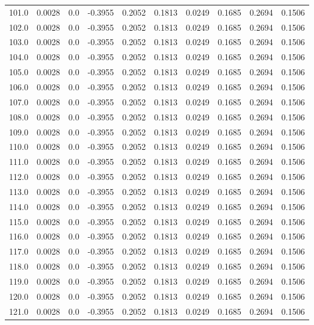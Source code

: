 \begin{longtable}{lrrrrrrrrr}
101.0 & 0.0028 & 0.0 & -0.3955 & 0.2052 & 0.1813 & 0.0249 & 0.1685 & 0.2694 & 0.1506 \\
102.0 & 0.0028 & 0.0 & -0.3955 & 0.2052 & 0.1813 & 0.0249 & 0.1685 & 0.2694 & 0.1506 \\
103.0 & 0.0028 & 0.0 & -0.3955 & 0.2052 & 0.1813 & 0.0249 & 0.1685 & 0.2694 & 0.1506 \\
104.0 & 0.0028 & 0.0 & -0.3955 & 0.2052 & 0.1813 & 0.0249 & 0.1685 & 0.2694 & 0.1506 \\
105.0 & 0.0028 & 0.0 & -0.3955 & 0.2052 & 0.1813 & 0.0249 & 0.1685 & 0.2694 & 0.1506 \\
106.0 & 0.0028 & 0.0 & -0.3955 & 0.2052 & 0.1813 & 0.0249 & 0.1685 & 0.2694 & 0.1506 \\
107.0 & 0.0028 & 0.0 & -0.3955 & 0.2052 & 0.1813 & 0.0249 & 0.1685 & 0.2694 & 0.1506 \\
108.0 & 0.0028 & 0.0 & -0.3955 & 0.2052 & 0.1813 & 0.0249 & 0.1685 & 0.2694 & 0.1506 \\
109.0 & 0.0028 & 0.0 & -0.3955 & 0.2052 & 0.1813 & 0.0249 & 0.1685 & 0.2694 & 0.1506 \\
110.0 & 0.0028 & 0.0 & -0.3955 & 0.2052 & 0.1813 & 0.0249 & 0.1685 & 0.2694 & 0.1506 \\
111.0 & 0.0028 & 0.0 & -0.3955 & 0.2052 & 0.1813 & 0.0249 & 0.1685 & 0.2694 & 0.1506 \\
112.0 & 0.0028 & 0.0 & -0.3955 & 0.2052 & 0.1813 & 0.0249 & 0.1685 & 0.2694 & 0.1506 \\
113.0 & 0.0028 & 0.0 & -0.3955 & 0.2052 & 0.1813 & 0.0249 & 0.1685 & 0.2694 & 0.1506 \\
114.0 & 0.0028 & 0.0 & -0.3955 & 0.2052 & 0.1813 & 0.0249 & 0.1685 & 0.2694 & 0.1506 \\
115.0 & 0.0028 & 0.0 & -0.3955 & 0.2052 & 0.1813 & 0.0249 & 0.1685 & 0.2694 & 0.1506 \\
116.0 & 0.0028 & 0.0 & -0.3955 & 0.2052 & 0.1813 & 0.0249 & 0.1685 & 0.2694 & 0.1506 \\
117.0 & 0.0028 & 0.0 & -0.3955 & 0.2052 & 0.1813 & 0.0249 & 0.1685 & 0.2694 & 0.1506 \\
118.0 & 0.0028 & 0.0 & -0.3955 & 0.2052 & 0.1813 & 0.0249 & 0.1685 & 0.2694 & 0.1506 \\
119.0 & 0.0028 & 0.0 & -0.3955 & 0.2052 & 0.1813 & 0.0249 & 0.1685 & 0.2694 & 0.1506 \\
120.0 & 0.0028 & 0.0 & -0.3955 & 0.2052 & 0.1813 & 0.0249 & 0.1685 & 0.2694 & 0.1506 \\
121.0 & 0.0028 & 0.0 & -0.3955 & 0.2052 & 0.1813 & 0.0249 & 0.1685 & 0.2694 & 0.1506 \\

\end{longtable}

